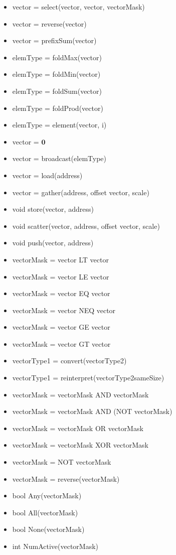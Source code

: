 \documentclass[11pt]{amsart}
\begin{document}
\begin{itemize}
\item vector = select(vector, vector, vectorMask)
\item vector = reverse(vector)
\item vector = prefixSum(vector)
\item elemType = foldMax(vector)
\item elemType = foldMin(vector)
\item elemType = foldSum(vector)
\item elemType = foldProd(vector)
\item elemType = element(vector, i)
\item vector = $\mathbf{0}$
\item vector = broadcast(elemType)
\item vector = load(address)
\item vector = gather(address, offset vector, scale)
\item void store(vector, address)
\item void scatter(vector, address, offset vector, scale)
\item void push(vector, address)
\item vectorMask = vector LT vector
\item vectorMask = vector LE vector
\item vectorMask = vector EQ vector
\item vectorMask = vector NEQ vector
\item vectorMask = vector GE vector
\item vectorMask = vector GT vector
\item vectorType1 = convert(vectorType2)
\item vectorType1 = reinterpret(vectorType2sameSize)
\item vectorMask = vectorMask AND vectorMask
\item vectorMask = vectorMask AND (NOT vectorMask)
\item vectorMask = vectorMask OR vectorMask
\item vectorMask = vectorMask XOR vectorMask
\item vectorMask = NOT vectorMask
\item vectorMask = reverse(vectorMask)
\item bool Any(vectorMask)
\item bool All(vectorMask)
\item bool None(vectorMask)

\item int NumActive(vectorMask)
\end{itemize}
\end{document}
